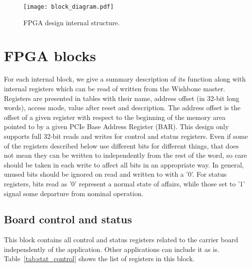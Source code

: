 \documentclass{article}
\begin{document}
\begin{figure}[htbp]
  \centering
  \texttt{[image: block\_diagram.pdf]}
  \caption{FPGA design internal structure.}
  \label{fig:block_diagram}
\end{figure}

\section{FPGA blocks}
For each internal block, we give a summary description of its function along with internal registers which can be read of written from the Wishbone master. Registers are presented in tables with their name, address offset (in 32-bit long words), access mode, value after reset and description. The address offset is the offset of a given register with respect to the beginning of the memory area pointed to by a given PCIe Base Address Register (BAR). This design only supports full 32-bit reads and writes for control and status registers. Even if some of the registers described below use different bits for different things, that does not mean they can be written to independently from the rest of the word, so care should be taken in each write to affect all bits in an appropriate way. In general, unused bits should be ignored on read and written to with a '0'. For status registers, bits read as '0' represent a normal state of affairs, while those set to '1' signal some departure from nominal operation.

\subsection{Board control and status}
This block contains all control and status registers related to the carrier board independently of the application. Other applications can include it as is. Table~\ref{tab:stat_control} shows the list of registers in this block.
\end{document}
